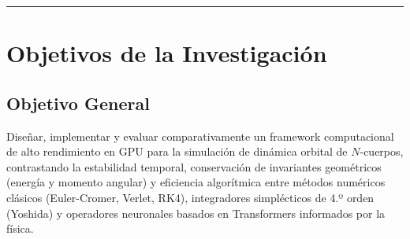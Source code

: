 \documentclass[11pt,a4paper]{article}
\begin{document}
\vspace{0.3cm}
\hrule
\vspace{0.5cm}

\section{Objetivos de la Investigación}

\subsection{Objetivo General}
Diseñar, implementar y evaluar comparativamente un framework computacional de alto rendimiento en GPU para la simulación de dinámica orbital de $N$-cuerpos, contrastando la estabilidad temporal, conservación de invariantes geométricos (energía y momento angular) y eficiencia algorítmica entre métodos numéricos clásicos (Euler-Cromer, Verlet, RK4), integradores simplécticos de 4.º orden (Yoshida) y operadores neuronales basados en Transformers informados por la física.
\end{document}
